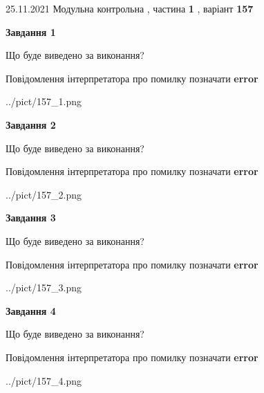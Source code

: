 \documentclass[10pt, ukrainian]{article}
\begin{document}
{25.11.2021 Модульна контрольна , частина \textbf { 1 }, варіант  \No \textbf { 157 }\par}
{
\begin {large}

{\begin {center}\textbf{Завдання 1}\end {center}}\par
Що буде виведено за виконання? \par
Повідомлення інтерпретатора про помилку позначати \textbf{error}

\begin{center}
	{../pict/157_1.png}
\end{center}
\newpage

{\begin {center}\textbf{Завдання 2}\end {center}}\par
Що буде виведено за виконання? \par
Повідомлення інтерпретатора про помилку позначати \textbf{error}

\begin{center}
	{../pict/157_2.png}
\end{center}
\newpage

{\begin {center}\textbf{Завдання 3}\end {center}}\par
Що буде виведено за виконання? \par
Повідомлення інтерпретатора про помилку позначати \textbf{error}

\begin{center}
	{../pict/157_3.png}
\end{center}
\newpage

{\begin {center}\textbf{Завдання 4}\end {center}}\par
Що буде виведено за виконання? \par
Повідомлення інтерпретатора про помилку позначати \textbf{error}

\begin{center}
	{../pict/157_4.png}
\end{center}
\newpage


\end{large}}
\end{document}
